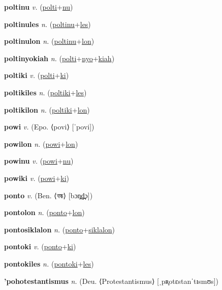 \textbf{\hypertarget{poltinu}{poltinu}} \textit{v.} (\hyperlink{polti}{polti}+\allowbreak \hyperlink{nu}{nu})


\textbf{\hypertarget{poltinules}{poltinules}} \textit{n.} (\hyperlink{poltinu}{poltinu}+\allowbreak \hyperlink{les}{les})


\textbf{\hypertarget{poltinulon}{poltinulon}} \textit{n.} (\hyperlink{poltinu}{poltinu}+\allowbreak \hyperlink{lon}{lon})


\textbf{\hypertarget{poltinyokiah}{poltinyokiah}} \textit{n.} (\hyperlink{polti}{polti}+\allowbreak \hyperlink{nyo}{nyo}+\allowbreak \hyperlink{kiah}{kiah})


\textbf{\hypertarget{poltiki}{poltiki}} \textit{v.} (\hyperlink{polti}{polti}+\allowbreak \hyperlink{ki}{ki})


\textbf{\hypertarget{poltikiles}{poltikiles}} \textit{n.} (\hyperlink{poltiki}{poltiki}+\allowbreak \hyperlink{les}{les})


\textbf{\hypertarget{poltikilon}{poltikilon}} \textit{n.} (\hyperlink{poltiki}{poltiki}+\allowbreak \hyperlink{lon}{lon})


\textbf{\hypertarget{powi}{powi}} \textit{v.} (Epo. ⟨povi⟩ [ˈpovi])


\textbf{\hypertarget{powilon}{powilon}} \textit{n.} (\hyperlink{powi}{powi}+\allowbreak \hyperlink{lon}{lon})


\textbf{\hypertarget{powinu}{powinu}} \textit{v.} (\hyperlink{powi}{powi}+\allowbreak \hyperlink{nu}{nu})


\textbf{\hypertarget{powiki}{powiki}} \textit{v.} (\hyperlink{powi}{powi}+\allowbreak \hyperlink{ki}{ki})


\textbf{\hypertarget{ponto}{ponto}} \textit{v.} (Ben. ⟨{\bengali{}বন্ধ}⟩ [bɔn̪d̪̤ɔ])


\textbf{\hypertarget{pontolon}{pontolon}} \textit{n.} (\hyperlink{ponto}{ponto}+\allowbreak \hyperlink{lon}{lon})


\textbf{\hypertarget{pontosiklalon}{pontosiklalon}} \textit{n.} (\hyperlink{ponto}{ponto}+\allowbreak \hyperlink{siklalon}{siklalon})


\textbf{\hypertarget{pontoki}{pontoki}} \textit{v.} (\hyperlink{ponto}{ponto}+\allowbreak \hyperlink{ki}{ki})


\textbf{\hypertarget{pontokiles}{pontokiles}} \textit{n.} (\hyperlink{pontoki}{pontoki}+\allowbreak \hyperlink{les}{les})


\textbf{\hypertarget{'pohotestantismus}{'pohotestantismus}} \textit{n.} (Deu. ⟨Protestantismus⟩ [ˌpʀ̥otɛstanˈtɪsmʊs])


